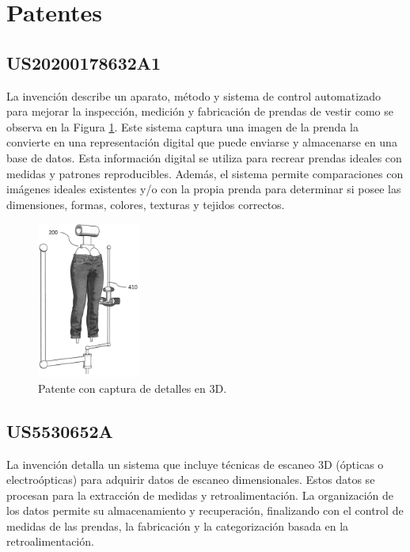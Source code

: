 \section{Patentes}

\subsection{US20200178632A1}
La invención \cite{us20200178632a1} describe un aparato, método y sistema de control automatizado para mejorar la inspección, medición y fabricación de prendas de vestir como se observa en la Figura \ref{fig:US20200178632A1-20200611-D00005}. Este sistema captura una imagen de la prenda la convierte en una representación digital que puede enviarse y almacenarse en una base de datos. Esta información digital se utiliza para recrear prendas ideales con medidas y patrones reproducibles. Además, el sistema permite comparaciones con imágenes ideales existentes y/o con la propia prenda para determinar si posee las dimensiones, formas, colores, texturas y tejidos correctos.

\begin{figure}[H]
	\centering
	\includegraphics[width=0.3\textwidth]{img/US20200178632A1-20200611-D00005.png}
	\caption{Patente con captura de detalles en 3D.}
	\label{fig:US20200178632A1-20200611-D00005}
\end{figure}

\subsection{US5530652A}

La invención \cite{US5530652A} detalla un sistema que incluye técnicas de escaneo 3D (ópticas o electroópticas) para adquirir datos de escaneo dimensionales. Estos datos se procesan para la extracción de medidas y retroalimentación. La organización de los datos permite su almacenamiento y recuperación, finalizando con el control de medidas de las prendas, la fabricación y la categorización basada en la retroalimentación.

